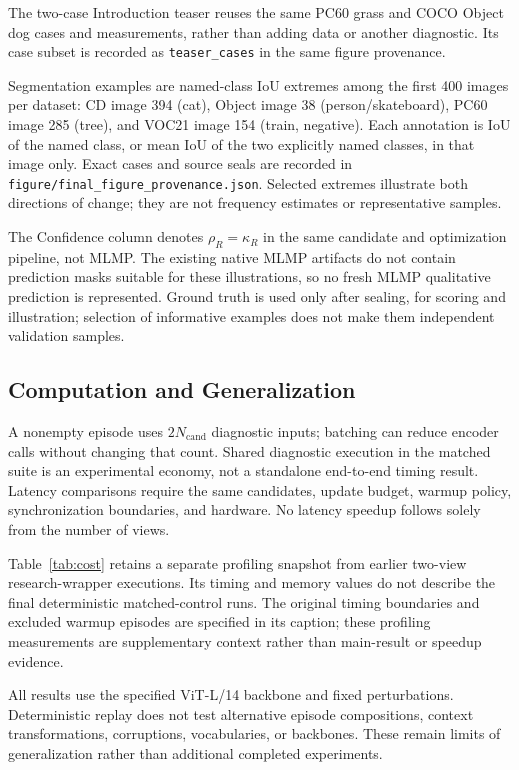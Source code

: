 The two-case Introduction teaser reuses the same PC60 grass and COCO Object dog cases and measurements, rather than adding data or another diagnostic. Its case subset is recorded as \texttt{teaser\_cases} in the same figure provenance.

Segmentation examples are named-class IoU extremes among the first 400 images per dataset: CD image 394 (cat), Object image 38 (person/skateboard), PC60 image 285 (tree), and VOC21 image 154 (train, negative). Each annotation is IoU of the named class, or mean IoU of the two explicitly named classes, in that image only. Exact cases and source seals are recorded in \texttt{figure/final\_figure\_provenance.json}. Selected extremes illustrate both directions of change; they are not frequency estimates or representative samples.

The Confidence column denotes $\rho_R=\kappa_R$ in the same candidate and optimization pipeline, not MLMP. The existing native MLMP artifacts do not contain prediction masks suitable for these illustrations, so no fresh MLMP qualitative prediction is represented. Ground truth is used only after sealing, for scoring and illustration; selection of informative examples does not make them independent validation samples.

\subsection{Computation and Generalization}
A nonempty episode uses $2N_{\mathrm{cand}}$ diagnostic inputs; batching can reduce encoder calls without changing that count. Shared diagnostic execution in the matched suite is an experimental economy, not a standalone end-to-end timing result. Latency comparisons require the same candidates, update budget, warmup policy, synchronization boundaries, and hardware. No latency speedup follows solely from the number of views.

Table~\ref{tab:cost} retains a separate profiling snapshot from earlier two-view research-wrapper executions. Its timing and memory values do not describe the final deterministic matched-control runs. The original timing boundaries and excluded warmup episodes are specified in its caption; these profiling measurements are supplementary context rather than main-result or speedup evidence.



All results use the specified ViT-L/14 backbone and fixed perturbations. Deterministic replay does not test alternative episode compositions, context transformations, corruptions, vocabularies, or backbones. These remain limits of generalization rather than additional completed experiments.

